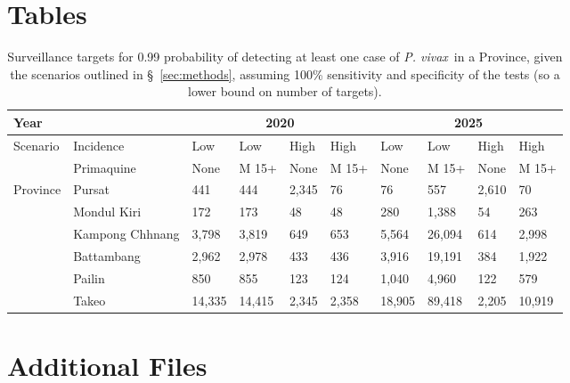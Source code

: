 \documentclass[doublespacing]{bmcart}
\newcommand{\pv}{\textit{P. vivax}}
\begin{document}
\begin{backmatter}

\section*{Tables}
\begin{table}[h!]
\caption{Surveillance targets for 0.99 probability of detecting at least one case of \pv~in a Province, given the scenarios outlined in \S~\ref{sec:methods}, assuming 100\% sensitivity and specificity of the tests (so a lower bound on number of targets).}
      \begin{tabular}{|l|l|l|l|l|l|l|l|l|l|}
       \hline 
       \multicolumn{2}{|l|}{Year} & \multicolumn{4}{|c|}{2020} & \multicolumn{4}{|c|}{2025} \\ \hline
       \multirow{2}{*}{Scenario} & Incidence & Low & Low & High & High & Low & Low & High & High \\ %
                                 & Primaquine & None & M 15+ & None & M 15+ & None & M 15+ & None & M 15+ \\ \hline
    \multirow{6}{*}{Province} & Pursat & 441 & 444 & 2,345 & 76 & 76 & 557 & 2,610 & 70 \\ %
                              & Mondul Kiri & 172 & 173 & 48 & 48 & 280 & 1,388 & 54 & 263 \\ %
                              & Kampong Chhnang & 3,798 & 3,819 & 649 & 653 & 5,564 & 26,094 & 614 & 2,998 \\ %
                              & Battambang & 2,962 & 2,978 & 433 & 436 & 3,916 & 19,191 & 384 & 1,922 \\ %
                              & Pailin & 850 & 855 & 123 & 124 & 1,040 & 4,960 & 122 & 579 \\ %
                              & Takeo & 14,335 & 14,415 & 2,345 & 2,358 & 18,905 & 89,418 & 2,205 & 10,919 \\ \hline 
      \end{tabular}
\end{table}


\section*{Additional Files}

\end{backmatter}
\end{document}
